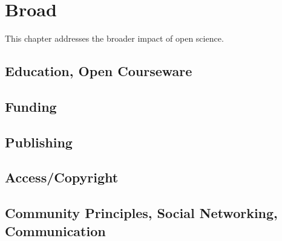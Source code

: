 \chapter{Broad}

This chapter addresses the broader impact of open science.

\section{Education, Open Courseware}

\section{Funding}

\section{Publishing}

\section{Access/Copyright}

\section{Community Principles, Social Networking, Communication}

